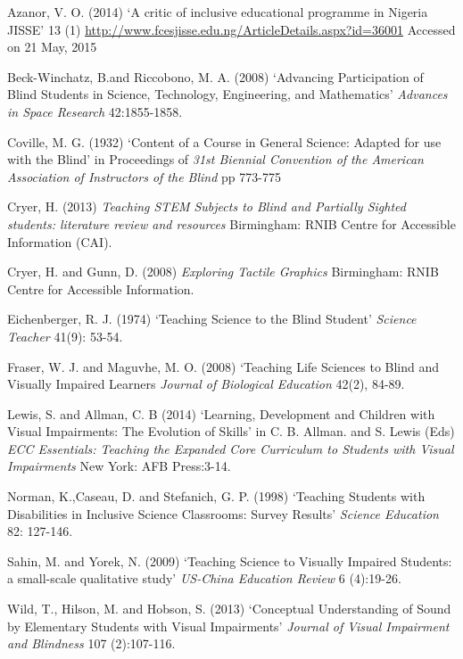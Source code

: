 \documentclass[11.5pt]{sig-alternate} %
\begin{document}
Azanor, V. O. (2014) ‘A critic of inclusive educational programme in Nigeria JISSE’ 13 (1) \url{http://www.fcesjisse.edu.ng/ArticleDetails.aspx?id=36001} Accessed on 21 May, 2015

Beck-Winchatz, B.and Riccobono, M. A. (2008) ‘Advancing Participation of Blind Students in Science, Technology, Engineering, and Mathematics’ \textit{Advances in Space Research} 42:1855-1858.

Coville, M. G. (1932) ‘Content of a Course in General Science: Adapted for use with the Blind’ in Proceedings of \textit{31st Biennial Convention of the American Association of Instructors of the Blind} pp 773-775

Cryer, H. (2013) \textit{Teaching STEM Subjects to Blind and Partially Sighted students: literature review and resources} Birmingham: RNIB Centre for Accessible Information (CAI).

Cryer, H. and Gunn, D. (2008) \textit{Exploring Tactile Graphics} Birmingham: RNIB Centre for Accessible Information.

Eichenberger, R. J. (1974) ‘Teaching Science to the Blind Student’ \textit{Science Teacher} 41(9): 53-54.

Fraser, W. J. and Maguvhe, M. O. (2008) ‘Teaching Life Sciences to Blind and Visually Impaired Learners \textit{Journal of Biological Education} 42(2), 84-89.

Lewis, S. and Allman, C. B (2014) ‘Learning, Development and Children with Visual Impairments: The Evolution of Skills’ in C. B. Allman. and S. Lewis (Eds) \textit{ECC Essentials: Teaching the Expanded Core Curriculum to Students with Visual Impairments} New York: AFB Press:3-14.

Norman, K.,Caseau, D. and Stefanich, G. P. (1998) ‘Teaching Students with Disabilities in Inclusive Science Classrooms: Survey Results’ \textit{Science Education} 82: 127-146.

Sahin, M. and Yorek, N. (2009) ‘Teaching Science to Visually Impaired Students: a small-scale qualitative study’ \textit{US-China Education Review} 6 (4):19-26.

Wild, T., Hilson, M. and Hobson, S. (2013) ‘Conceptual Understanding of Sound by Elementary Students with Visual Impairments’ \textit{Journal of Visual Impairment and Blindness} 107 (2):107-116.
\end{document}

